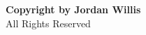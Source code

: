 \clearpage
\vspace*{\fill}
\begin{center}
\textbf{Copyright  by Jordan Willis} \\
All Rights Reserved
\end{center}
\vfill %
\clearpage